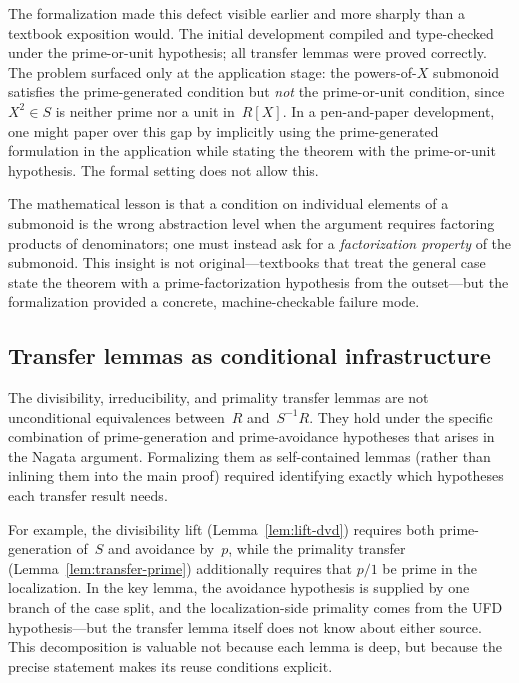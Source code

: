 \documentclass[11pt]{article}
\theoremstyle{plain}
\theoremstyle{definition}
\theoremstyle{remark}
\begin{document}
The formalization made this defect visible earlier and more sharply than a
textbook exposition would.  The initial development compiled and type-checked
under the prime-or-unit hypothesis; all transfer lemmas were proved correctly.
The problem surfaced only at the application stage: the powers-of-$X$ submonoid
satisfies the prime-generated condition but \emph{not} the prime-or-unit
condition, since $X^2\in S$ is neither prime nor a unit in~$R[X]$.  In a
pen-and-paper development, one might paper over this gap by implicitly using the
prime-generated formulation in the application while stating the theorem with
the prime-or-unit hypothesis.  The formal setting does not allow this.

The mathematical lesson is that a condition on individual elements of a
submonoid is the wrong abstraction level when the argument requires factoring
products of denominators; one must instead ask for a \emph{factorization
property} of the submonoid.  This insight is not original---textbooks that
treat the general case state the theorem with a prime-factorization hypothesis
from the outset---but the formalization provided a concrete, machine-checkable
failure mode.

\subsection{Transfer lemmas as conditional infrastructure}\label{sec:transfer}

The divisibility, irreducibility, and primality transfer lemmas are not
unconditional equivalences between~$R$ and~$S^{-1}R$.  They hold under the
specific combination of prime-generation and prime-avoidance hypotheses that
arises in the Nagata argument.  Formalizing them as self-contained lemmas
(rather than inlining them into the main proof) required identifying exactly
which hypotheses each transfer result needs.

For example, the divisibility lift (Lemma~\ref{lem:lift-dvd}) requires both
prime-generation of~$S$ and avoidance by~$p$, while the primality transfer
(Lemma~\ref{lem:transfer-prime}) additionally requires that $p/1$ be prime in
the localization.  In the key lemma, the avoidance hypothesis is supplied by
one branch of the case split, and the localization-side primality comes from
the UFD hypothesis---but the transfer lemma itself does not know about either
source.  This decomposition is valuable not because each lemma is deep, but
because the precise statement makes its reuse conditions explicit.
\end{document}
